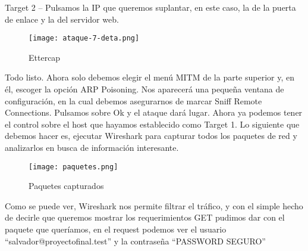     Target 2 – Pulsamos la IP que queremos suplantar, en este caso, la de la 
    puerta de enlace y la del servidor web.

    \begin{center}
        \begin{figure}   
           \begin{center}
              \texttt{[image: ataque-7-deta.png]}
           \end{center}
           \caption{Ettercap}
        \end{figure}
     \end{center}

Todo listo. Ahora solo debemos elegir el menú MITM de la parte superior y, en él, 
escoger la opción ARP Poisoning. Nos aparecerá una pequeña ventana de configuración, 
en la cual debemos asegurarnos de marcar Sniff Remote Connections.
Pulsamos sobre Ok y el ataque dará lugar. Ahora ya podemos tener el control 
sobre el host que hayamos establecido como Target 1. Lo siguiente que debemos 
hacer es, ejecutar Wireshark para capturar todos los paquetes de 
red y analizarlos en busca de información interesante.

\begin{center}
   \begin{figure}   
      \begin{center}
         \texttt{[image: paquetes.png]}
      \end{center}
      \caption{Paquetes capturados}
   \end{figure}
\end{center}

Como se puede ver, Wireshark nos permite filtrar el tráfico, y con el 
simple hecho de decirle que queremos mostrar los requerimientos GET
pudimos dar con el paquete que queríamos, en el request podemos ver
el usuario “salvador@proyectofinal.test” y la contraseña “PASSWORD SEGURO”
